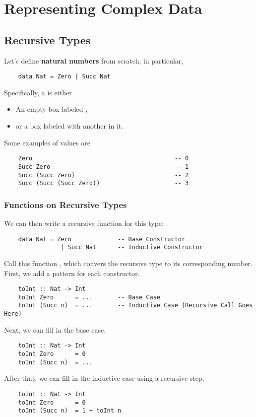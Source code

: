 \documentclass[letterpaper]{article}
\begin{document}
\section{Representing Complex Data}
\subsection{Recursive Types}
Let's define \textbf{natural numbers} from scratch; in particular,
\begin{verbatim}
    data Nat = Zero | Succ Nat \end{verbatim}
Specifically, a  is either 
\begin{itemize}
    \item An empty box labeled ,
    \item or a box labeled  with another  in it.
\end{itemize}
Some examples of  values are 
\begin{verbatim}
    Zero                                        -- 0
    Succ Zero                                   -- 1
    Succ (Succ Zero)                            -- 2
    Succ (Succ (Succ Zero))                     -- 3
\end{verbatim}

\subsubsection{Functions on Recursive Types}
We can then write a recursive function for this type:
\begin{verbatim}
    data Nat = Zero             -- Base Constructor
                | Succ Nat      -- Inductive Constructor \end{verbatim}
Call this function , which convers the recursive type to its corresponding number. First, we add a pattern for each constructor. 
\begin{verbatim}
    toInt :: Nat -> Int 
    toInt Zero      = ...       -- Base Case 
    toInt (Succ n)  = ...       -- Inductive Case (Recursive Call Goes Here) \end{verbatim}
Next, we can fill in the base case.
\begin{verbatim}
    toInt :: Nat -> Int 
    toInt Zero      = 0
    toInt (Succ n)  = ...\end{verbatim}
After that, we can fill in the inductive case using a recursive step.
\begin{verbatim}
    toInt :: Nat -> Int 
    toInt Zero      = 0
    toInt (Succ n)  = 1 + toInt n\end{verbatim}
\end{document}
